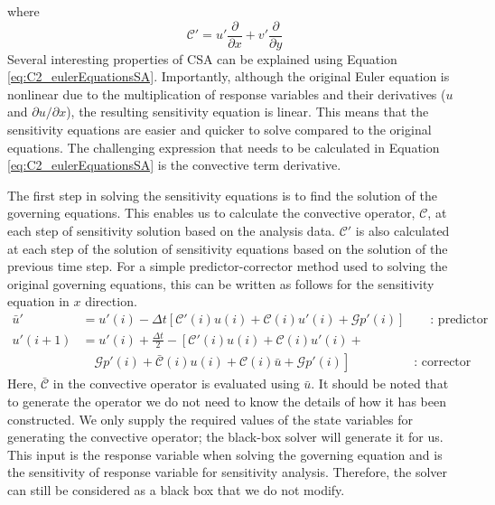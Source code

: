 %
where
%
\begin{equation*}
    \mathcal{C}' = u' \frac{\partial}{\partial x} + v' \frac{\partial}{\partial y}
\end{equation*}
%
Several interesting properties of CSA can be explained using Equation \eqref{eq:C2_eulerEquationsSA}. Importantly, although the original Euler equation is nonlinear due to the multiplication of response variables and their derivatives ($u$ and $\partial u/\partial x$), the resulting sensitivity equation is linear. This means that the sensitivity equations are easier and quicker to solve compared to the original equations. The challenging expression that needs to be calculated in Equation \eqref{eq:C2_eulerEquationsSA} is the convective term derivative.

The first step in solving the sensitivity equations is to find the solution of the governing equations. This enables us to calculate the convective operator, $\mathcal{C}$, at each step of sensitivity solution based on the analysis data. $\mathcal{C}'$ is also calculated at each step of the solution of sensitivity equations based on the solution of the previous time step. For a simple predictor-corrector method used to solving the original governing equations, this can be written as follows for the sensitivity equation in $x$ direction.
%
\begin{align*}
    \bar{u}' &= u'(i) - 
    \Delta t \left[ \mathcal{C}'(i) u(i) + \mathcal{C}(i) u'(i) + \mathcal{G} p'(i) \right]
    \qquad \text{: predictor}
    \\
    u'(i+1) &= u'(i) + \frac{\Delta t}{2} - 
    \left[ \mathcal{C}'(i) u(i) + \mathcal{C}(i) u'(i) + \right. \\
    &\quad \left.  \mathcal{G} p'(i) + \bar{\mathcal{C}}(i) u(i) + \mathcal{C}(i) \bar{u} + \mathcal{G} p'(i)\right]
    \qquad \qquad \quad \text{: corrector}
\end{align*}
%
Here, $\bar{\mathcal{C}}$ in the convective operator is evaluated using $\bar{u}$. It should be noted that to generate the operator we do not need to know the details of how it has been constructed. We only supply the required values of the state variables for generating the convective operator; the black-box solver will generate it for us. This input is the response variable when solving the governing equation and is the sensitivity of response variable for sensitivity analysis. Therefore, the solver can still be considered as a black box that we do not modify.
